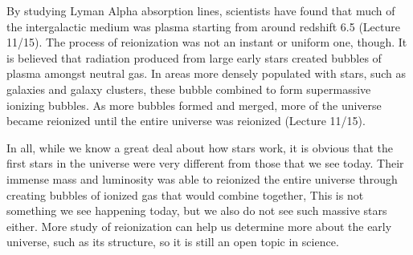 \documentclass[12pt]{article}
\begin{document}
By studying Lyman Alpha absorption lines, scientists have found that much of the
intergalactic medium was plasma starting from around redshift 6.5 (Lecture
11/15).  The process
of reionization was not an instant or uniform one, though.  It is believed that
radiation produced from large early stars created bubbles of plasma amongst
neutral gas.  In areas more densely populated with stars, such as galaxies and
galaxy clusters, these bubble combined to form supermassive ionizing bubbles.
As more bubbles formed and merged, more of the universe became reionized until
the entire universe was reionized (Lecture 11/15).

In all, while we know a great deal about how stars work, it is obvious that the
first stars in the universe were very different  from those that we see today.
Their immense mass and luminosity was able to reionized the entire universe
through creating bubbles of ionized gas that would combine together,  This is
not something we see happening today, but we also do not see such massive stars
either.  More study of reionization can help us determine more about the early
universe, such as its structure, so it is still an open topic in science.
\end{document}
